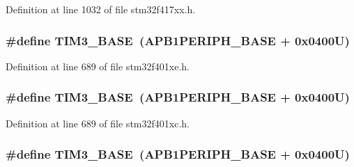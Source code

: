 Definition at line 1032 of file stm32f417xx.\+h.

\subsubsection[{\texorpdfstring{T\+I\+M3\+\_\+\+B\+A\+SE}{TIM3_BASE}}]{\setlength{\rightskip}{0pt plus 5cm}\#define T\+I\+M3\+\_\+\+B\+A\+SE~({\bf A\+P\+B1\+P\+E\+R\+I\+P\+H\+\_\+\+B\+A\+SE} + 0x0400\+U)}\hypertarget{group___peripheral__registers__structures_gaf0c34a518f87e1e505cd2332e989564a}{}\label{group___peripheral__registers__structures_gaf0c34a518f87e1e505cd2332e989564a}


Definition at line 689 of file stm32f401xe.\+h.

\subsubsection[{\texorpdfstring{T\+I\+M3\+\_\+\+B\+A\+SE}{TIM3_BASE}}]{\setlength{\rightskip}{0pt plus 5cm}\#define T\+I\+M3\+\_\+\+B\+A\+SE~({\bf A\+P\+B1\+P\+E\+R\+I\+P\+H\+\_\+\+B\+A\+SE} + 0x0400\+U)}\hypertarget{group___peripheral__registers__structures_gaf0c34a518f87e1e505cd2332e989564a}{}\label{group___peripheral__registers__structures_gaf0c34a518f87e1e505cd2332e989564a}


Definition at line 689 of file stm32f401xc.\+h.

\subsubsection[{\texorpdfstring{T\+I\+M3\+\_\+\+B\+A\+SE}{TIM3_BASE}}]{\setlength{\rightskip}{0pt plus 5cm}\#define T\+I\+M3\+\_\+\+B\+A\+SE~({\bf A\+P\+B1\+P\+E\+R\+I\+P\+H\+\_\+\+B\+A\+SE} + 0x0400\+U)}\hypertarget{group___peripheral__registers__structures_gaf0c34a518f87e1e505cd2332e989564a}{}\label{group___peripheral__registers__structures_gaf0c34a518f87e1e505cd2332e989564a}


